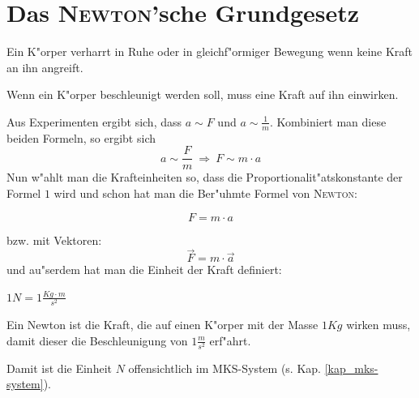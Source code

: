 \section{Das \textsc{Newton}'sche Grundgesetz}
\label{kap_newton}


\begin{Wichtig}
    Ein K"orper verharrt in Ruhe oder in
   gleichf"ormiger Bewegung wenn keine Kraft an ihn angreift.
\end{Wichtig}

\begin{Wichtig}
   Wenn ein K"orper beschleunigt werden soll, muss eine Kraft auf ihn
   einwirken.
\end{Wichtig}

Aus Experimenten ergibt sich, dass $a \sim F$ und $a \sim
\frac{1}{m}$. Kombiniert man diese beiden Formeln, so ergibt sich
$$
a \sim \frac{F}{m} ~\Rightarrow ~ F \sim m \cdot a
$$
Nun w"ahlt man die Krafteinheiten so, dass die
Proportionalit"atskonstante der Formel $1$ wird und schon hat man die
Ber"uhmte Formel von \textsc{Newton}:
\begin{Wichtig}
     \begin{equation}
          \boxed{
              F = m \cdot a
          }
          \label{eqn_newton}
     \end{equation}
\end{Wichtig}
bzw. mit Vektoren:
$$
\vec F = m \cdot \vec a
$$
und au"serdem hat man die Einheit der Kraft definiert:
\begin{Def}
     $1N = 1\frac{Kg \cdot m}{s^2}$
     
     Ein Newton ist die Kraft, die auf einen K"orper mit der Masse $1
     Kg$ wirken muss, damit dieser die Beschleunigung von $1
     \frac{m}{s^2}$ erf"ahrt.
\end{Def}
Damit ist die Einheit $N$ offensichtlich im MKS-System
(s. Kap. \ref{kap_mks-system}).


